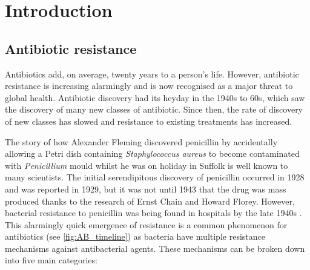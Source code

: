 \section{Introduction}

\subsection{Antibiotic resistance}

Antibiotics add, on average, twenty years to a person's life\cite{davies2013drugs}. However, antibiotic resistance is increasing alarmingly and is now recognised as a major threat to global health\cite{ResistanceUS,davies2013drugs}. Antibiotic discovery had its heyday in the 1940s to 60s, which saw the discovery of many new classes of antibiotic. Since then, the rate of discovery of new classes has slowed and resistance to existing treatments has increased.

The story of how Alexander Fleming discovered penicillin by accidentally allowing a Petri dish containing \textit{Staphylococcus aureus} to become contaminated with \textit{Penicillium} mould whilst he was on holiday in Suffolk \cite{davies2013drugs} is well known to many scientists. The initial serendipitous discovery of penicillin occurred in 1928 and was reported in 1929\cite{Fleming1929}, but it was not until 1943 that the drug was mass produced thanks to the research of Ernst Chain and Howard Florey. However, bacterial resistance to penicillin was being found in hospitals by the late 1940s \cite{Barber1947, Rountree1949}. This alarmingly quick emergence of resistance is a common phenomenon for antibiotics (see \ref{fig:AB_timeline}) as bacteria have multiple resistance mechanisms against antibacterial agents. These mechanisms can be broken down into five main categories:

